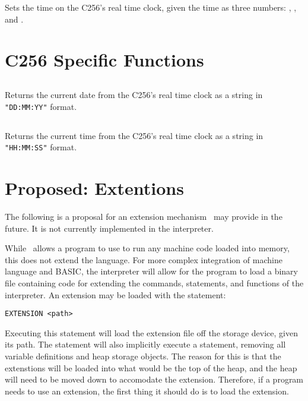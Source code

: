 \documentclass{report}
\begin{document}
    Sets the time on the C256's real time clock, given the time as three numbers:
    , , and .

    \section*{C256 Specific Functions}

    \subsection*{}

    Returns the current date from the C256's real time clock as a string
    in \verb+"DD:MM:YY"+ format.

    \subsection*{}

    Returns the current time from the C256's real time clock as a string
    in \verb+"HH:MM:SS"+ format.    

    \section*{Proposed: Extentions}

    The following is a proposal for an extension mechanism \BASIC\ may provide in the future.
    It is not currently implemented in the interpreter.

    While \BASIC\ allows a program to use  to run any machine code loaded into memory,
    this does not extend the language.
    For more complex integration of machine language and BASIC, the interpreter will allow for
    the program to load a binary file containing code for extending the commands, statements,
    and functions of the interpreter. An extension may be loaded with the statement:

    \begin{verbatim}
EXTENSION <path>        
    \end{verbatim}

    Executing this statement will load the extension file off the storage device, given its path.
    The statement will also implicitly execute a  statement, removing all variable
    definitions and heap storage objects. The reason for this is that the extenstions will be loaded
    into what would be the top of the heap, and the heap will need to be moved down to accomodate
    the extension. Therefore, if a program needs to use an extension, the first thing it should do
    is to load the extension.
\end{document}
